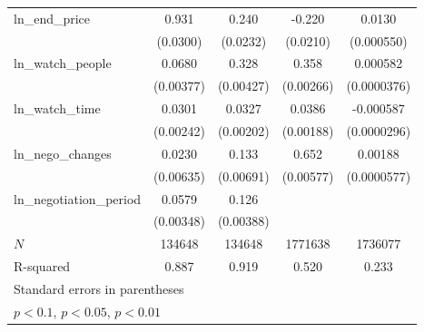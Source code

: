 {\begin{tabular}{l*{4}{c}}
ln\_end\_price&       0.931\sym{***}&       0.240\sym{***}&      -0.220\sym{***}&      0.0130\sym{***}\\
            &    (0.0300)         &    (0.0232)         &    (0.0210)         &  (0.000550)         \\
\addlinespace
ln\_watch\_people&      0.0680\sym{***}&       0.328\sym{***}&       0.358\sym{***}&    0.000582\sym{***}\\
            &   (0.00377)         &   (0.00427)         &   (0.00266)         & (0.0000376)         \\
\addlinespace
ln\_watch\_time&      0.0301\sym{***}&      0.0327\sym{***}&      0.0386\sym{***}&   -0.000587\sym{***}\\
            &   (0.00242)         &   (0.00202)         &   (0.00188)         & (0.0000296)         \\
\addlinespace
ln\_nego\_changes&      0.0230\sym{***}&       0.133\sym{***}&       0.652\sym{***}&     0.00188\sym{***}\\
            &   (0.00635)         &   (0.00691)         &   (0.00577)         & (0.0000577)         \\
\addlinespace
ln\_negotiation\_period&      0.0579\sym{***}&       0.126\sym{***}&                     &                     \\
            &   (0.00348)         &   (0.00388)         &                     &                     \\
\midrule
\(N\)       &      134648         &      134648         &     1771638         &     1736077         \\
R-squared   &       0.887         &       0.919         &       0.520         &       0.233         \\
\bottomrule
\multicolumn{5}{l}{\footnotesize Standard errors in parentheses}\\
\multicolumn{5}{l}{\footnotesize \sym{*} \(p<0.1\), \sym{**} \(p<0.05\), \sym{***} \(p<0.01\)}\\
\end{tabular}
}
